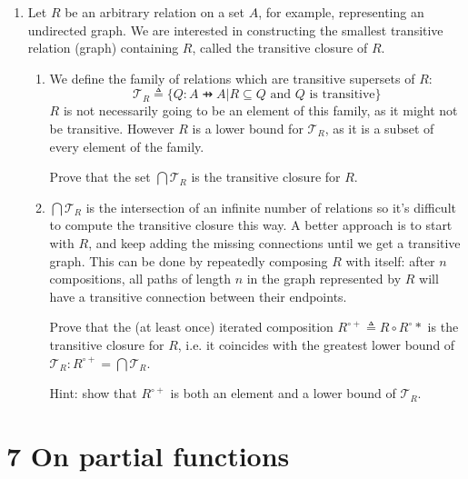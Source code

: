 \documentclass[10pt,\jkfside,a4paper]{article}
\begin{document}
\begin{enumerate}
\begin{enumerate}
\end{enumerate}

\item Let $R$ be an arbitrary relation on a set $A$, for example, representing an undirected graph.
We are interested in constructing the smallest transitive relation (graph) containing $R$, called the 
transitive closure of $R$.

\begin{enumerate}

\item We define the family of relations which are transitive supersets of $R$:
\begin{equation}
\mathcal{T}_R \triangleq \{Q: A \pfun A | R \subseteq Q \text{ and } Q \text{ is transitive}\}
\end{equation}
$R$ is not necessarily going to be an element of this family, as it might not be transitive.
However $R$ is a lower bound for $\mathcal{T}_R$, as it is a subset of every element of the family.

Prove that the set $\bigcap \mathcal{T}_R$ is the transitive closure for $R$.



\item $\bigcap \mathcal{T}_R$ is the intersection of an infinite number of relations so it's difficult 
to compute the transitive closure this way. A better approach is to start with $R$, and keep adding the 
missing connections until we get a transitive graph. This can be done by repeatedly composing $R$ with 
itself: after $n$ compositions, all paths of length $n$ in the graph represented by $R$ will have a 
transitive connection between their endpoints.

Prove that the (at least once) iterated composition $R^{\circ +} \triangleq R \circ R^{\circ}*$ is the 
transitive closure for $R$, i.e. it coincides with the greatest lower bound of $\mathcal{T}_R: R^{\circ +} = \bigcap \mathcal{T}_R$.

Hint: show that $R^{\circ +}$ is both an element and a lower bound of $\mathcal{T}_R$.



\end{enumerate}

\end{enumerate}

\section*{7 On partial functions}
\end{document}
